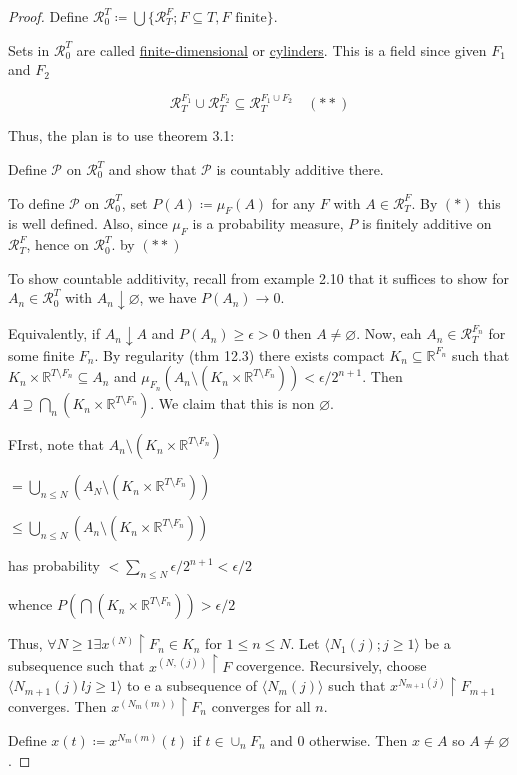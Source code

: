 \documentclass{article}
\theoremstyle{definition}
\begin{document}
\begin{proof}
    Define \(\mathcal{R}^T_0 \coloneqq \bigcup \{ \mathcal{R}_T^F ; F \subseteq T, F \text{ finite}  \} \).
    
    Sets in \(\mathcal{R}^T_0\) are called \underline{finite-dimensional} or \underline{cylinders}. This is a field since given \(F_1\) and \(F_2\) 
    
    \[
        \mathcal{R}^{F_1}_T \cup \mathcal{R}^{F_2}_T \subseteq \mathcal{R}_T^{F_1\cup F_2} \quad (\ast\ast)
    \]

    Thus, the plan is to use theorem 3.1:

    Define \(\mathcal{P}\) on \(\mathcal{R}^T_0\) and show that \(\mathcal{P}\) is countably additive there.
    
    To define \(\mathcal{P}\) on \(\mathcal{R}^T_0\), set \(P(A)\coloneqq \mu_F(A)\) for any \(F\) with \(A\in \mathcal{R}^F_T\). By \((\ast)\) this is well defined. Also, since \(\mu_F\) is a probability measure, \(P\) is finitely additive on \(\mathcal{R}^F_T\), hence on \(\mathcal{R}^T_0\). by \((\ast\ast)\) 

    To show countable additivity, recall from example 2.10 that it suffices to show for \(A_n\in \mathcal{R}^T_0\) with \(A_n\downarrow \varnothing\), we have \(P(A_n)\to 0\).
    
    Equivalently, if \(A_n\downarrow A\) and \(P(A_n)\geq \epsilon > 0\) then \(A \neq \varnothing\). Now, eah \(A_n\in \mathcal{R}_T^{F_n}\) for some finite \(F_n\). By regularity (thm 12.3) there exists compact \(K_n \subseteq \mathbb{R}^{F_n}\) such that \(K_n\times\mathbb{R}^{T \setminus F_n} \subseteq A_n\) and \(\mu_{F_n}(A_n \setminus (K_n \times \mathbb{R}^{T \setminus F_n}))< \epsilon / 2^{n+1} \). Then \(A \supseteq \bigcap_n (K_n \times \mathbb{R}^{T \setminus F_n})\). We claim that this is non \(\varnothing\).
    
    FIrst, note that \(A_n \setminus (K_n \times \mathbb{R}^{T \setminus F_n})\)
    
    \(= \bigcup_{n \leq N} (A_N \setminus (K_n \times \mathbb{R}^{T \setminus F_n}))\)
    
    \(\leq \bigcup_{n \leq N}(A_n \setminus (K_n \times \mathbb{R}^{T \setminus F_n}))\) 

    has probability \(< \sum_{n\leq N}^{} \epsilon / 2^{n+1} < \epsilon /2 \) 

    whence \(P(\bigcap (K_n \times \mathbb{R}^{T \setminus F_n})) > \epsilon / 2\) 

    Thus, \(\forall N \geq 1 \exists x^{(N)}\upharpoonright F_n \in K_n\) for \(1 \leq n \leq N\). Let \(\langle N_1(j); j \geq 1 \rangle \) be a subsequence such that \(x^{(N,(j))}\upharpoonright F\) covergence. Recursively, choose \(\langle N_{m+1}(j)l j \geq 1 \rangle \) to e a subsequence of \(\langle N_m(j) \rangle \) such that \(x^{N_{m+1}(j)}\upharpoonright F_{m+1}\) converges. Then \(x^{(N_m(m))}\upharpoonright F_n\) converges for all \(n\).

    Define \(x(t)\coloneqq x^{N_m(m)}(t)\) if \(t\in \cup_n F_n\) and \(0\) otherwise. Then \(x\in A\) so \(A \neq \varnothing\).  

\end{proof}
\end{document}

